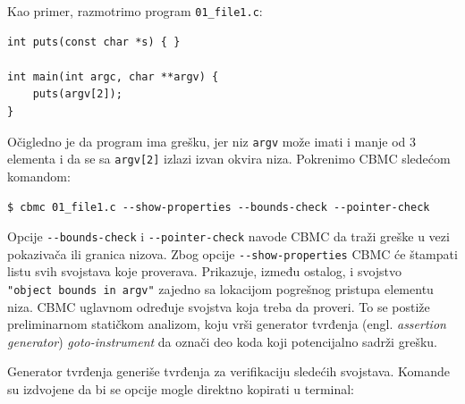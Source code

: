 Kao primer, razmotrimo program \texttt{01\_file1.c}:

\begin{verbatim}
int puts(const char *s) { }

int main(int argc, char **argv) {
    puts(argv[2]);
}
\end{verbatim}

Očigledno je da program ima grešku, jer niz \texttt{argv} može imati i manje od 3 elementa i da se sa \texttt{argv{[}2{]}} izlazi izvan okvira niza. Pokrenimo CBMC sledećom komandom:

\begin{verbatim}
$ cbmc 01_file1.c --show-properties --bounds-check --pointer-check
\end{verbatim}

Opcije \texttt{-{}-bounds-check} i \texttt{-{}-pointer-check} navode CBMC da traži greške u vezi pokazivača ili granica nizova. Zbog opcije \texttt{-{}-show-properties} CBMC će štampati listu svih svojstava koje proverava. Prikazuje, između ostalog, i svojstvo \texttt{"object\ bounds\ in\ argv"} zajedno sa lokacijom pogrešnog pristupa elementu niza. CBMC uglavnom određuje svojstva koja treba da proveri. To se postiže preliminarnom statičkom analizom, koju vrši generator tvrđenja (engl. \emph{assertion generator}) \emph{goto-instrument} da označi deo koda koji potencijalno sadrži grešku.

Generator tvrđenja generiše tvrđenja za verifikaciju sledećih svojstava. Komande su izdvojene da bi se opcije mogle direktno kopirati u terminal:

